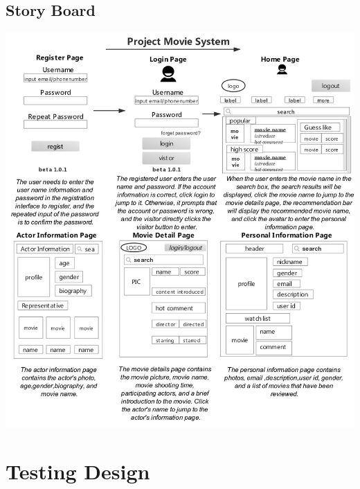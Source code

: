 \documentclass[12pt]{article}
\begin{document}
\subsection{Story Board}
\includegraphics[width=1\linewidth]{Story.jpg}\\\newpage

\section{Testing Design}
\end{document}
